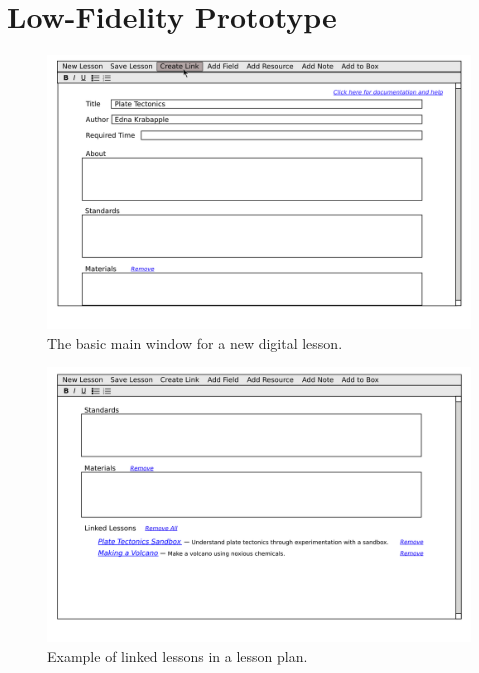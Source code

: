 \documentclass[10pt,letter]{article}
\begin{document}
\section{Low-Fidelity Prototype}
\begin{figure}[htb]
	\centering
	\includegraphics[width=0.9\linewidth]{../../low-fi_prototype/button_mouseover}
	\caption{The basic main window for a new digital lesson.}
	\label{fig: main window}
\end{figure}

\begin{figure}[htb]
	\centering
	\includegraphics[width=0.9\linewidth]{../../low-fi_prototype/linked_lessons}
	\caption{Example of linked lessons in a lesson plan.}
	\label{fig: linked lesson}
\end{figure}
\end{document}
